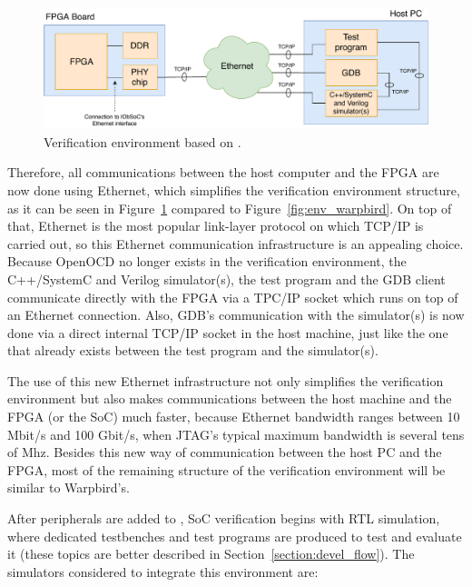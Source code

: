 \begin{figure}[!h]
	\centering
	\includegraphics[width=1\linewidth]{Figures/env}
	\caption{Verification environment based on \socname.}
	\label{fig:env}
\end{figure}

Therefore, all communications between the host computer and the FPGA are now done using Ethernet, which simplifies the verification environment structure, as it can be seen in Figure~\ref{fig:env} compared to Figure~\ref{fig:env_warpbird}. On top of that, Ethernet is the most popular link-layer protocol on which TCP/IP is carried out, so this Ethernet communication infrastructure is an appealing choice. Because OpenOCD no longer exists in the verification environment, the C++/SystemC and Verilog simulator(s), the test program and the GDB client communicate directly with the FPGA via a TPC/IP socket which runs on top of an Ethernet connection. Also, GDB's communication with the simulator(s) is now done via a direct internal TCP/IP socket in the host machine, just like the one that already exists between the test program and the simulator(s).

The use of this new Ethernet infrastructure not only simplifies the verification environment but also makes communications between the host machine and the FPGA (or the SoC) much faster, because Ethernet bandwidth ranges between 10 Mbit/s and 100 Gbit/s, when JTAG's typical maximum bandwidth is several tens of Mhz. Besides this new way of communication between the host PC and the FPGA, most of the remaining structure of the verification environment will be similar to Warpbird's. 

After peripherals are added to \socname, SoC verification begins with RTL simulation, where dedicated testbenches and test programs are produced to test and evaluate it (these topics are better described in Section~\ref{section:devel_flow}). The simulators considered to integrate this environment are:

